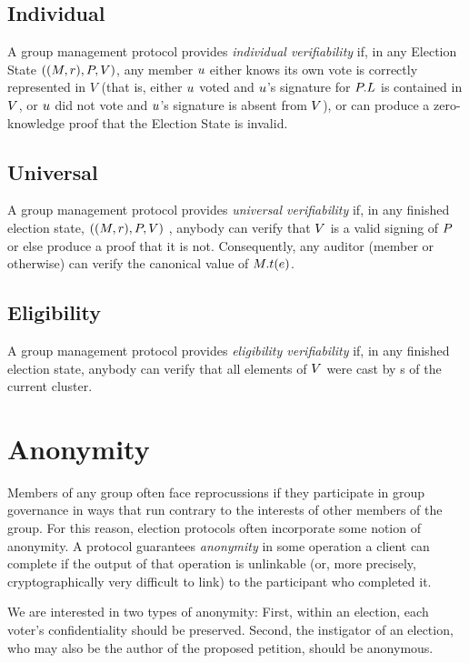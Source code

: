   \subsection{Individual}
  A group management protocol provides \emph{individual verifiability} if, in
  any Election State $((M, r), P, V)$, any member
  $u$ either knows its own vote is correctly represented in $V$ (that
  is, either $u$ voted and $u$'s signature for
  $P.L$ is contained
  in $V$, or $u$ did not vote and $u$'s signature is
  absent from $V$), or can produce a zero-knowledge proof that the
  Election State is invalid.

  \subsection{Universal}
  A group management protocol provides \emph{universal verifiability} if, in any
  finished election state, $((M, r), P, V)$ , anybody can
  verify that $V$ is a valid signing of $P$ or else produce a
  proof that it is not. Consequently, any auditor (member or otherwise) can
  verify the canonical value of $M.t(e)$.

  \subsection{Eligibility}
  A group management protocol provides \emph{eligibility verifiability} if, in
  any finished election state, anybody can verify that all elements of
  $V$ were cast by \KwMember s of the current cluster.

\section{Anonymity}
Members of any group often face reprocussions if they participate in group
governance in ways that run contrary to the interests of other members of
the group. For this reason, election protocols often incorporate some notion
of anonymity. A protocol guarantees \emph{anonymity} in some operation a
client can complete if the output of that operation is unlinkable (or, more
precisely, cryptographically very difficult to link) to the participant who
completed it\cite{ford_hiding_2014}.

We are interested in two types of anonymity: First, within an election,
each voter's confidentiality should be preserved. Second, the instigator of an
election, who may also be the author of the proposed petition, should be
anonymous.

